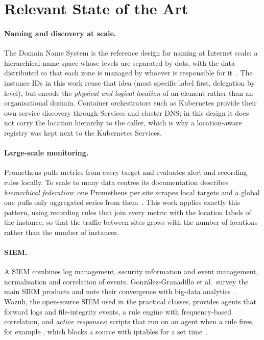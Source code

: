 \section{Relevant State of the Art}
\label{sec:sota}

\paragraph{Naming and discovery at scale.}
The Domain Name System is the reference design for naming at Internet scale: a hierarchical name
space whose levels are separated by dots, with the data distributed so that each zone is managed by
whoever is responsible for it~\cite{rfc1034}. The instance IDs in this work reuse that idea (most specific label
first, delegation by level), but encode the \emph{physical and logical location} of an element
rather than an organisational domain. Container orchestrators such as Kubernetes provide their own
service discovery through Services and cluster DNS; in this design it does not carry the location
hierarchy to the caller, which is why a location-aware registry was kept next to the Kubernetes
Services.

\paragraph{Large-scale monitoring.}
Prometheus pulls metrics from every target and evaluates alert and recording rules locally. To
scale to many data centres its documentation describes \emph{hierarchical federation}: one
Prometheus per site scrapes local targets and a global one pulls only aggregated series from
them~\cite{prometheus_federation}. This work applies exactly this pattern, using recording rules that join
every metric with the location labels of the instance, so that the traffic between sites grows with
the number of locations rather than the number of instances.

\paragraph{SIEM.}
A SIEM combines log management, security information and event management, normalisation and
correlation of events. González-Granadillo et al.\ survey the main SIEM products and note their
convergence with big-data analytics~\cite{gonzalez2021siem}. Wazuh, the open-source SIEM used in
the practical classes, provides agents that forward logs and file-integrity events, a rule engine
with frequency-based correlation, and \emph{active responses}: scripts that run on an agent when a
rule fires, for example , which blocks a source with iptables for a set
time~\cite{wazuh_ar}.

